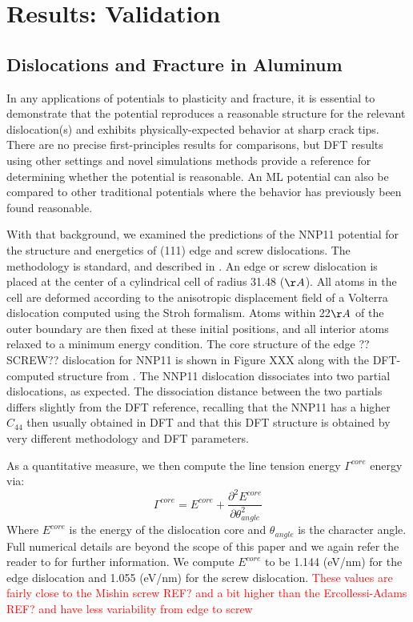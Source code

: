 \documentclass{article}
\begin{document}
\section{Results: Validation}

\subsection{Dislocations and Fracture in Aluminum} \label{sct:fracture_dislocation}

In any applications of potentials to plasticity and fracture, it is essential to demonstrate that the potential reproduces a reasonable structure for the relevant dislocation(s) and exhibits physically-expected behavior at sharp crack tips.  There are no precise first-principles results for comparisons, but DFT results using other settings and novel simulations methods provide a reference for determining whether the potential is reasonable.  An ML potential can also be compared to other traditional potentials where the behavior has previously been found reasonable.

With that background, we examined the predictions of the NNP11 potential for the structure and energetics of (111) edge and screw dislocations.
The methodology is standard, and described in \cite{Hu2020AtomisticDynamics}.  An edge or screw dislocation is placed at the center of a cylindrical cell of radius 31.48 ($\AA$).  All atoms in the cell are deformed according to the anisotropic displacement field of a Volterra dislocation computed using the Stroh formalism\cite{Stroh1958DislocationsElasticity}.  Atoms within 22$\AA$ of the outer boundary are then fixed at these initial positions, and all interior atoms relaxed to a minimum energy condition.  The core structure of the edge ?? SCREW?? dislocation for NNP11 is shown in Figure XXX along with the DFT-computed structure from \cite{Woodward2008PredictionTheory}.  The NNP11 dislocation dissociates into two partial dislocations, as expected.  The dissociation distance between the two partials differs slightly from the DFT reference, recalling that the NNP11 has a higher $C_{44}$ then usually obtained in DFT and that this DFT structure is obtained by very different methodology and DFT parameters.

As a quantitative measure, we then compute the line tension energy $\Gamma^{core}$ energy via:
\begin{equation}
    \Gamma^{core} = E^{core} + \frac{\partial^2E^{core}}{\partial\theta^2_{angle}}
\end{equation}
Where $E^{core}$ is the energy of the dislocation core and $\theta_{angle}$ is the character angle. 
Full numerical details are beyond the scope of this paper and we again refer the reader to \cite{Hu2020AtomisticDynamics} for further information.
We compute $E^{core}$ to be 1.144 (eV/nm) for the edge dislocation and 1.055 (eV/nm) for the screw dislocation.
\textcolor{red}{These values are fairly close to the Mishin screw REF? and a bit higher than the Ercollessi-Adams REF? and have less variability from edge to screw}
\end{document}
